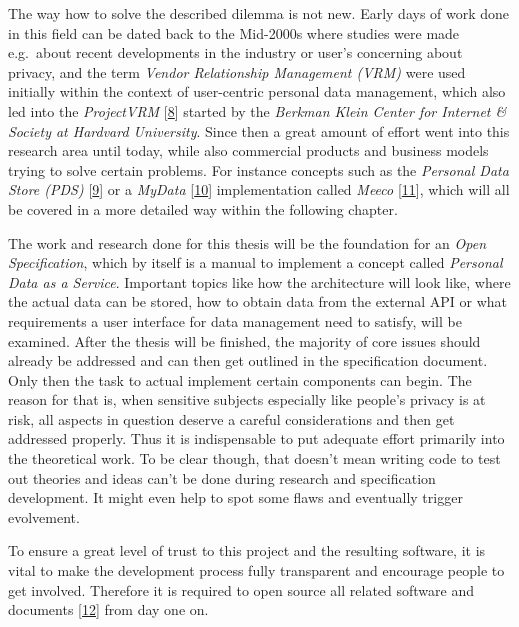 \documentclass[12pt,english,a4paper,titlepage,cleardoublepage=empty,dottedtoc]{report}
\begin{document}
The way how to solve the described dilemma is not new. Early days of
work done in this field can be dated back to the Mid-2000s where studies
were made e.g.~about recent developments in the industry or user's
concerning about privacy, and the term \emph{Vendor Relationship
Management (VRM)} were used initially within the context of user-centric
personal data management, which also led into the \emph{ProjectVRM}
{[}\protect\hyperlink{ref-web_2010_projectvrm_about}{8}{]} started by
the \emph{Berkman Klein Center for Internet \& Society at Hardvard
University}. Since then a great amount of effort went into this research
area until today, while also commercial products and business models
trying to solve certain problems. For instance concepts such as the
\emph{Personal Data Store (PDS)}
{[}\protect\hyperlink{ref-paper_2013_the-personal-data-store-approach-to-personal-data-security_2013}{9}{]}
or a \emph{MyData}
{[}\protect\hyperlink{ref-whitepaper_2014_mydata-a-nordic-model-for-human-centered-personal-data-management-and-processing}{10}{]}
implementation called \emph{Meeco}
{[}\protect\hyperlink{ref-web_2016_meeco-how-it-works}{11}{]}, which
will all be covered in a more detailed way within the following chapter.

The work and research done for this thesis will be the foundation for an
\emph{Open Specification}, which by itself is a manual to implement a
concept called \emph{Personal Data as a Service}. Important topics like
how the architecture will look like, where the actual data can be
stored, how to obtain data from the external API or what requirements a
user interface for data management need to satisfy, will be examined.
After the thesis will be finished, the majority of core issues should
already be addressed and can then get outlined in the specification
document. Only then the task to actual implement certain components can
begin. The reason for that is, when sensitive subjects especially like
people's privacy is at risk, all aspects in question deserve a careful
considerations and then get addressed properly. Thus it is indispensable
to put adequate effort primarily into the theoretical work. To be clear
though, that doesn't mean writing code to test out theories and ideas
can't be done during research and specification development. It might
even help to spot some flaws and eventually trigger evolvement.

To ensure a great level of trust to this project and the resulting
software, it is vital to make the development process fully transparent
and encourage people to get involved. Therefore it is required to open
source all related software and documents
{[}\protect\hyperlink{ref-repo_2016_pdaas-spec}{12}{]} from day one on.
\end{document}
